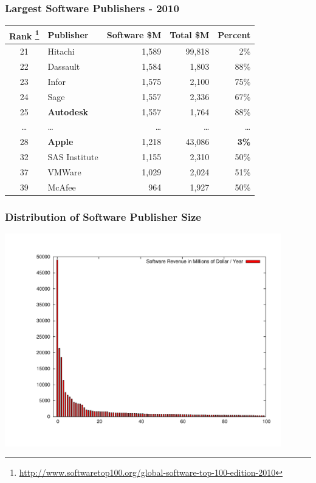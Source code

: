 \documentclass[18pt]{beamer}
\begin{document}
{
\begin{frame}
\frametitle{Largest Software Publishers - 2010}

\begin{center}
\begin{tabular}{clrrr}
\hline
\textbf{Rank
\footnote{
\url{http://www.softwaretop100.org/global-software-top-100-edition-2010}}
} &\textbf{Publisher} & \textbf{Software \$M} & \textbf{Total \$M} & \textbf{Percent} \\
\hline
\hline
21 & Hitachi & 1,589 & 99,818 & 2\% \\
22 & Dassault & 1,584 & 1,803 & 88\% \\
23 & Infor & 1,575 & 2,100 & 75\% \\
24 & Sage & 1,557 & 2,336 & 67\% \\
25 & \textbf{Autodesk} & 1,557 & 1,764 & 88\% \\
\ldots & \ldots & \ldots & \ldots & \ldots \\
28 & \textbf{Apple} & 1,218 & 43,086 &  \textbf{3\%}  \\
32 & SAS Institute & 1,155  &  2,310 & 50\%  \\
37 & VMWare & 1,029 & 2,024 &  51\%  \\
39 & McAfee & 964 & 1,927 & 50\% \\
\end{tabular}

\end{center}
\end{frame}
}


\begin{frame}
\frametitle{Distribution of Software Publisher Size}
  \includegraphics[width=0.9\textwidth,height=0.9\paperheight]{../Art/LargestSoftwarePublishersPlot.pdf}
\end{frame}
\end{document}
